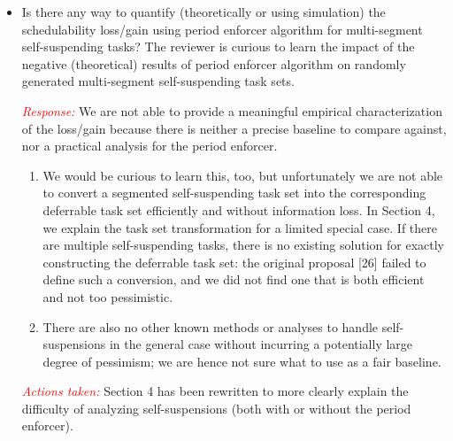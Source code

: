 \documentclass[12pt]{article}
\newenvironment{response}[0]{\textcolor{red}{\emph{Response: }}\color{blue}}{\medskip}
\newcommand{\action}[1]{\textcolor{red}{\emph{\it Actions taken: }}{\color{blue}#1}\medskip}
\begin{document}
\begin{itemize}
	\item  
Is there any way to quantify (theoretically or using simulation) the
schedulability loss/gain using period enforcer algorithm for multi-segment
self-suspending tasks? The reviewer is curious to learn the impact of the
negative (theoretical) results of period enforcer algorithm on randomly
generated multi-segment self-suspending task sets.  

\begin{response}We are not able to provide a meaningful empirical characterization of the loss/gain because there is neither a precise baseline to compare against, nor a practical analysis for the period enforcer. 
\begin{enumerate}
	\item We would be curious to learn this, too, but unfortunately we are not able to convert a segmented self-suspending task set into the corresponding deferrable task set efficiently and without  information loss. In Section 4, we explain the task set transformation for a limited special case. If there are multiple self-suspending tasks, there is no existing solution for exactly constructing the deferrable task set: the original proposal [26] failed to define such a conversion, and we did not find one that is both efficient and not too pessimistic. 
	

\item There are also no other known methods or analyses to handle self-suspensions in the general case without incurring a potentially large degree of pessimism; we are hence not sure what to use as a fair baseline.
\end{enumerate}

	
\end{response}

\action{Section 4 has been rewritten to  more clearly explain the difficulty of analyzing self-suspensions (both with or without the period enforcer).}

\end{itemize}
\end{document}
